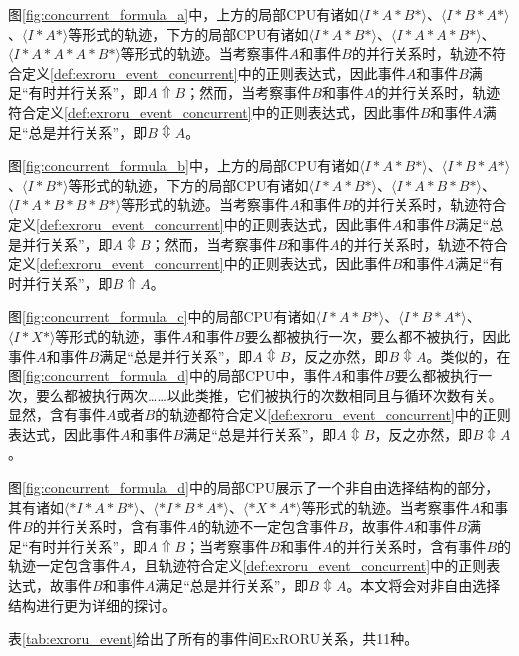 图\ref{fig:concurrent_formula_a}中，上方的局部CPU有诸如$\langle I*A*B*\rangle$、$\langle I*B*A*\rangle$、$\langle I*A*\rangle$等形式的轨迹，下方的局部CPU有诸如$\langle I*A*B*\rangle$、$\langle I*A*A*B*\rangle$、$\langle I*A*A*A*B*\rangle$等形式的轨迹。当考察事件$A$和事件$B$的并行关系时，轨迹不符合定义\ref{def:exroru_event_concurrent}中的正则表达式，因此事件$A$和事件$B$满足“有时并行关系”，即$A\Uparrow B$；然而，当考察事件$B$和事件$A$的并行关系时，轨迹符合定义\ref{def:exroru_event_concurrent}中的正则表达式，因此事件$B$和事件$A$满足“总是并行关系”，即$B\Updownarrow A$。

图\ref{fig:concurrent_formula_b}中，上方的局部CPU有诸如$\langle I*A*B*\rangle$、$\langle I*B*A*\rangle$、$\langle I*B*\rangle$等形式的轨迹，下方的局部CPU有诸如$\langle I*A*B*\rangle$、$\langle I*A*B*B*\rangle$、$\langle I*A*B*B*B*\rangle$等形式的轨迹。当考察事件$A$和事件$B$的并行关系时，轨迹符合定义\ref{def:exroru_event_concurrent}中的正则表达式，因此事件$A$和事件$B$满足“总是并行关系”，即$A\Updownarrow B$；然而，当考察事件$B$和事件$A$的并行关系时，轨迹不符合定义\ref{def:exroru_event_concurrent}中的正则表达式，因此事件$B$和事件$A$满足“有时并行关系”，即$B\Uparrow A$。

图\ref{fig:concurrent_formula_c}中的局部CPU有诸如$\langle I*A*B*\rangle$、$\langle I*B*A*\rangle$、$\langle I*X*\rangle$等形式的轨迹，事件$A$和事件$B$要么都被执行一次，要么都不被执行，因此事件$A$和事件$B$满足“总是并行关系”，即$A\Updownarrow B$，反之亦然，即$B\Updownarrow A$。类似的，在图\ref{fig:concurrent_formula_d}中的局部CPU中，事件$A$和事件$B$要么都被执行一次，要么都被执行两次……以此类推，它们被执行的次数相同且与循环次数有关。显然，含有事件$A$或者$B$的轨迹都符合定义\ref{def:exroru_event_concurrent}中的正则表达式，因此事件$A$和事件$B$满足“总是并行关系”，即$A\Updownarrow B$，反之亦然，即$B\Updownarrow A$。

图\ref{fig:concurrent_formula_d}中的局部CPU展示了一个非自由选择结构的部分，其有诸如$\langle *I*A*B*\rangle$、$\langle *I*B*A*\rangle$、$\langle *X*A*\rangle$等形式的轨迹。当考察事件$A$和事件$B$的并行关系时，含有事件$A$的轨迹不一定包含事件$B$，故事件$A$和事件$B$满足“有时并行关系”，即$A\Uparrow B$；当考察事件$B$和事件$A$的并行关系时，含有事件$B$的轨迹一定包含事件$A$，且轨迹符合定义\ref{def:exroru_event_concurrent}中的正则表达式，故事件$B$和事件$A$满足“总是并行关系”，即$B\Updownarrow A$。本文将会对非自由选择结构进行更为详细的探讨。

表\ref{tab:exroru_event}给出了所有的事件间ExRORU关系，共11种。

